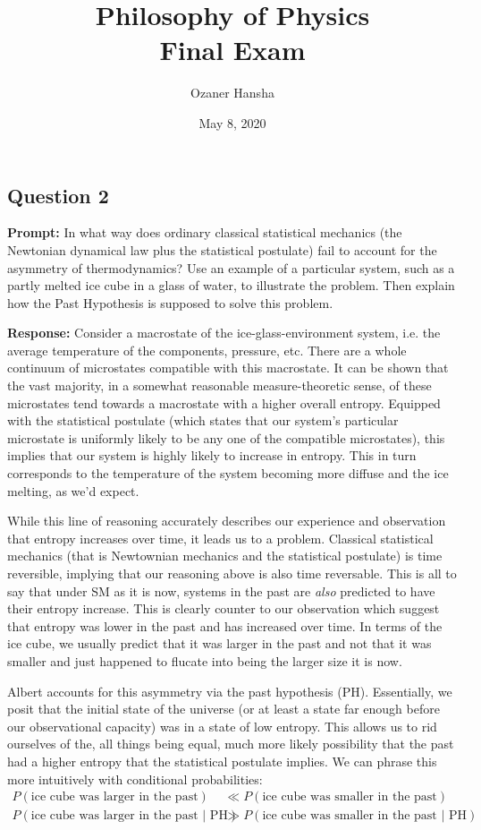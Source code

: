 \documentclass{article}
\begin{document}
\title{Philosophy of Physics\\Final Exam}
\author{Ozaner Hansha}
\date{May 8, 2020}
\maketitle
{}

\subsection*{Question 2}
\noindent\textbf{Prompt:} In what way does ordinary classical statistical mechanics (the Newtonian dynamical law plus the statistical postulate) fail to account for the asymmetry of thermodynamics? Use an example of a particular system, such as a partly melted ice cube in a glass of water, to illustrate the problem. Then explain how the Past Hypothesis is supposed to solve this problem.
\bigskip

\noindent\textbf{Response:} Consider a macrostate of the ice-glass-environment system, i.e. the average temperature of the components, pressure, etc. There are a whole continuum of microstates compatible with this macrostate. It can be shown that the vast majority, in a somewhat reasonable measure-theoretic sense, of these microstates tend towards a macrostate with a higher overall entropy. Equipped with the statistical postulate (which states that our system's particular microstate is uniformly likely to be any one of the compatible microstates), this implies that our system is highly likely to increase in entropy. This in turn corresponds to the temperature of the system becoming more diffuse and the ice melting, as we'd expect.

While this line of reasoning accurately describes our experience and observation that entropy increases over time, it leads us to a problem. Classical statistical mechanics (that is Newtownian mechanics and the statistical postulate) is time reversible, implying that our reasoning above is also time reversable. This is all to say that under SM as it is now, systems in the past are \textit{also} predicted to have their entropy increase. This is clearly counter to our observation which suggest that entropy was lower in the past and has increased over time. In terms of the ice cube, we usually predict that it was larger in the past and not that it was smaller and just happened to flucate into being the larger size it is now.

Albert accounts for this asymmetry via the past hypothesis (PH). Essentially, we posit that the initial state of the universe (or at least a state far enough before our observational capacity) was in a state of low entropy. This allows us to rid ourselves of the, all things being equal, much more likely possibility that the past had a higher entropy that the statistical postulate implies. We can phrase this more intuitively with conditional probabilities:
\begin{align*}
  P(\text{ice cube was larger in the past}) &\ll P(\text{ice cube was smaller in the past})\\
  P(\text{ice cube was larger in the past }|\text{ PH}) &\gg P(\text{ice cube was smaller in the past }|\text{ PH})
\end{align*}
\end{document}
